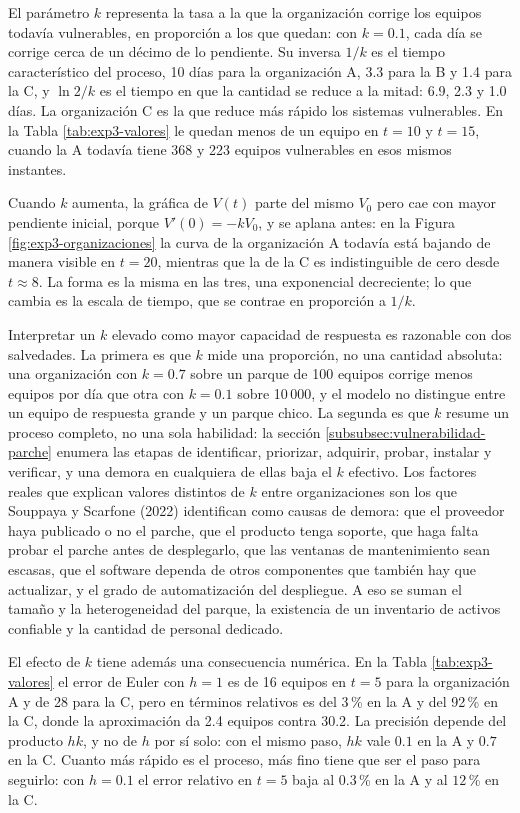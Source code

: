 El parámetro $k$ representa la tasa a la que la organización corrige los equipos todavía
vulnerables, en proporción a los que quedan: con $k = 0.1$, cada día se corrige cerca de un
décimo de lo pendiente. Su inversa $1/k$ es el tiempo característico del proceso, 10 días para la organización
A, 3.3 para la B y 1.4 para la C, y $\ln 2 / k$ es el tiempo en que la cantidad se reduce a la
mitad: 6.9, 2.3 y 1.0 días. La organización C es la que reduce más rápido los sistemas
vulnerables. En la Tabla \ref{tab:exp3-valores} le quedan menos de un equipo en $t = 10$ y
$t = 15$, cuando la A todavía tiene 368 y 223 equipos vulnerables en esos mismos instantes.

Cuando $k$ aumenta, la gráfica de $V(t)$ parte del mismo $V_0$ pero cae con mayor pendiente
inicial, porque $V'(0) = -k V_0$, y se aplana antes: en la Figura \ref{fig:exp3-organizaciones}
la curva de la organización A todavía está bajando de manera visible en $t = 20$, mientras que la
de la C es indistinguible de cero desde $t \approx 8$. La forma es la misma en las tres, una
exponencial decreciente; lo que cambia es la escala de tiempo, que se contrae en proporción a
$1/k$.

Interpretar un $k$ elevado como mayor capacidad de respuesta es razonable con dos salvedades. La
primera es que $k$ mide una proporción, no una cantidad absoluta: una organización con $k = 0.7$
sobre un parque de 100 equipos corrige menos equipos por día que otra con $k = 0.1$ sobre
10\,000, y el modelo no distingue entre un equipo de respuesta grande y un parque
chico. La segunda es que $k$ resume un proceso completo, no una sola habilidad: la sección
\ref{subsubsec:vulnerabilidad-parche} enumera las etapas de identificar, priorizar, adquirir,
probar, instalar y verificar, y una demora en cualquiera de ellas baja el $k$ efectivo. Los
factores reales que explican valores distintos de $k$ entre organizaciones son los que Souppaya
y Scarfone (2022) identifican como causas de demora: que el proveedor haya publicado o no el
parche, que el producto tenga soporte, que haga falta probar el parche antes de desplegarlo,
que las ventanas de mantenimiento sean escasas, que el software dependa de otros componentes
que también hay que actualizar, y el grado de automatización del despliegue. A eso se suman el
tamaño y la heterogeneidad del parque, la existencia de un inventario de activos confiable y la
cantidad de personal dedicado.

El efecto de $k$ tiene además una consecuencia numérica. En la Tabla \ref{tab:exp3-valores} el
error de Euler con $h = 1$ es de 16 equipos en $t = 5$ para la organización A y de 28 para la C,
pero en términos relativos es del 3\,\% en la A y del 92\,\% en la C, donde la aproximación da
2.4 equipos contra 30.2. La precisión depende del producto $hk$, y no de $h$ por sí solo: con
el mismo paso, $hk$ vale $0.1$ en la A y $0.7$ en la C. Cuanto más rápido es el proceso,
más fino tiene que ser el paso para seguirlo: con $h = 0.1$ el error relativo en $t = 5$ baja al
$0.3$\,\% en la A y al $12$\,\% en la C.


